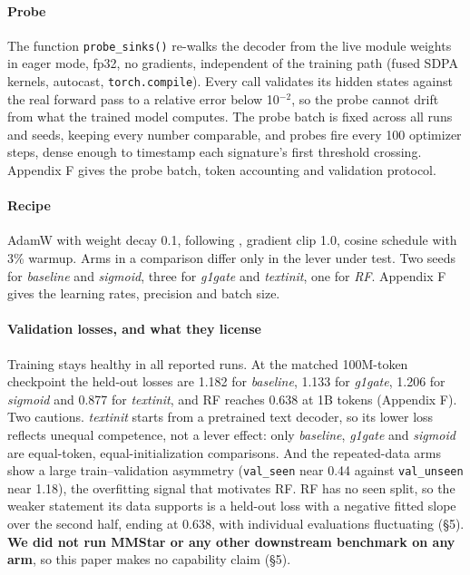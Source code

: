 \documentclass{article}
\begin{document}
\paragraph{Probe} The function \texttt{probe\_sinks()} re-walks the decoder from the live module weights in eager mode, fp32, no gradients, independent of the training path (fused SDPA kernels, autocast, \texttt{torch.compile}). Every call validates its hidden states against the real forward pass to a relative error below 10$^{-2}$, so the probe cannot drift from what the trained model computes. The probe batch is fixed across all runs and seeds, keeping every number comparable, and probes fire every 100 optimizer steps, dense enough to timestamp each signature's first threshold crossing. Appendix F gives the probe batch, token accounting and validation protocol.

\paragraph{Recipe} AdamW with weight decay 0.1, following \cite{ref6}, gradient clip 1.0, cosine schedule with 3\% warmup. Arms in a comparison differ only in the lever under test. Two seeds for \textit{baseline} and \textit{sigmoid}, three for \textit{g1gate} and \textit{textinit}, one for \textit{RF}. Appendix F gives the learning rates, precision and batch size.

\paragraph{Validation losses, and what they license} Training stays healthy in all reported runs. At the matched 100M-token checkpoint the held-out losses are 1.182 for \textit{baseline}, 1.133 for \textit{g1gate}, 1.206 for \textit{sigmoid} and 0.877 for \textit{textinit}, and RF reaches 0.638 at 1B tokens (Appendix F). Two cautions. \textit{textinit} starts from a pretrained text decoder, so its lower loss reflects unequal competence, not a lever effect: only \textit{baseline}, \textit{g1gate} and \textit{sigmoid} are equal-token, equal-initialization comparisons. And the repeated-data arms show a large train--validation asymmetry (\texttt{val\_seen} near 0.44 against \texttt{val\_unseen} near 1.18), the overfitting signal that motivates RF. RF has no seen split, so the weaker statement its data supports is a held-out loss with a negative fitted slope over the second half, ending at 0.638, with individual evaluations fluctuating (\S5). \textbf{We did not run MMStar or any other downstream benchmark on any arm}, so this paper makes no capability claim (\S5).
\end{document}

